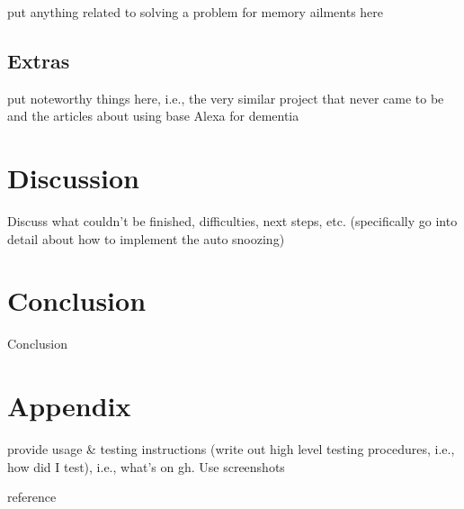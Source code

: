 \documentclass[11pt, oneside]{article}
\begin{document}
put anything related to solving a problem for memory ailments here

\subsection{Extras}

put noteworthy things here, i.e., the very similar project that never came to be and the articles about using base Alexa for dementia


\section{Discussion}

Discuss what couldn't be finished, difficulties, next steps, etc. (specifically go into detail about how to implement the auto snoozing)


\section{Conclusion}

Conclusion


\section{Appendix}

provide usage \& testing instructions (write out high level testing procedures, i.e., how did I test), i.e., what's on gh. Use screenshots


\begin{thebibliography}{00}
 reference
\end{thebibliography}
\end{document}
